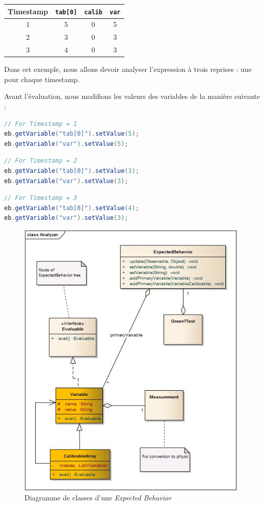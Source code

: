 \begin{exemple}
\begin{tabular}{cccc}

Timestamp & \texttt{tab[0]} & \texttt{calib} & \texttt{var}\\
\hline
1 & 5      &   0   & 5\\
2  & 3 & 0 & 3\\
3  & 4 & 0 & 3
\end{tabular}

Dans cet exemple, nous allons devoir analyser l'expression à trois reprises : une pour chaque timestamp.

Avant l'évaluation, nous modifions les valeurs des variables de la manière suivante : 
\begin{lstlisting}[language=java, numbers=none]
// For Timestamp = 1
eb.getVariable("tab[0]").setValue(5);
eb.getVariable("var").setValue(5);
\end{lstlisting}

\begin{lstlisting}[language=java, numbers=none]
// For Timestamp = 2
eb.getVariable("tab[0]").setValue(3);
eb.getVariable("var").setValue(3);
\end{lstlisting}

\begin{lstlisting}[language=java, numbers=none]
// For Timestamp = 3
eb.getVariable("tab[0]").setValue(4);
eb.getVariable("var").setValue(3);
\end{lstlisting}


\end{exemple}
\begin{figure}[H]
\centering
\includegraphics[width=11.0cm]{contents/images/eb.jpg}
\caption{Diagramme de classes d'une \textit{Expected Behavior}}
\label{fig:ebClasses}
\end{figure}

